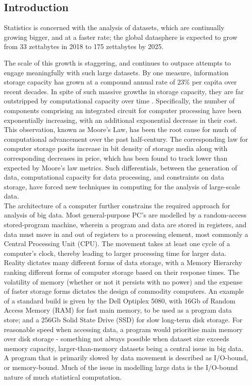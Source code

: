 \subsection{Introduction}
Statistics is concerned with the analysis of datasets, which are continually growing bigger, and at a faster rate; the global datasphere is expected to grow from 33 zettabytes in 2018 to 175 zettabytes by 2025\cite{rydning2018digitization}.

The scale of this growth is staggering, and continues to outpace attempts to engage meaningfully with such large datasets. By one measure, information storage capacity has grown at a compound annual rate of 23\% per capita over recent decades\cite{hilbert2011world}.
In spite of such massive growths in storage capacity, they are far outstripped by computational capacity over time \cite{fontana2018moore}.
Specifically, the number of components comprising an integrated circuit for computer processing have been exponentially increasing, with an additional exponential decrease in their cost\cite{moore1975progress}.
This observation, known as Moore's Law, has been the root cause for much of computational advancement over the past half-century.
The corresponding law for computer storage posits increase in bit density of storage media along with corresponding decreases in price, which has been found to track lower than expected by Moore's law metrics.
Such differentials, between the generation of data, computational capacity for data processing, and constraints on data storage, have forced new techniques in computing for the analysis of large-scale data.\\

The architecture of a computer further constrains the required approach for analysis of big data.
Most general-purpose PC's are modelled by a random-access stored-program machine, wherein a program and data are stored in registers, and data must move in and out of registers to a processing element, most commonly a Central Processing Unit (CPU). 
The movement takes at least one cycle of a computer's clock, thereby leading to larger processing time for larger data.\\

Reality dictates many different forms of data storage, with a Memory Hierarchy ranking different forms of computer storage based on their response times\cite{toy1986computer}.
The volatility of memory (whether or not it persists with no power) and the expense of faster storage forms dictates the design of commodity computers. An example of a standard build is given by the Dell Optiplex 5080, with 16Gb of Random Access Memory (RAM) for fast main memory, to be used as a program data store; and a 256Gb Solid State Drive (SSD) for slow long-term disk storage\cite{cornell2021standardcomp}.
For reasonable speed when accessing data, a program would prioritise main memory over disk storage - something not always possible when dataset size exceeds memory capacity, larger-than-memory datasets being a central issue in big data.
A program that is primarily slowed by data movement is described as I/O-bound, or memory-bound.
Much of the issue in modelling large data is the I/O-bound nature of much statistical computation.

